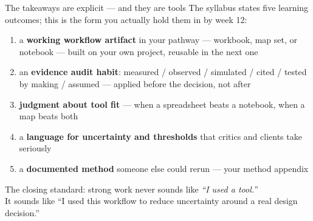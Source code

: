 \documentclass[aspectratio=169,10pt]{beamer}
\begin{document}
\begin{frame}{The takeaways are explicit --- and they are tools}
  The syllabus states five learning outcomes; this is the form you actually
  hold them in by week 12:
  \begin{enumerate}
    \item a \textbf{working workflow artifact} in your pathway --- workbook,
          map set, or notebook --- built on your own project, reusable in the
          next one
    \item an \textbf{evidence audit habit}: measured / observed / simulated /
          cited / tested by making / assumed --- applied before the decision,
          not after
    \item \textbf{judgment about tool fit} --- when a spreadsheet beats a
          notebook, when a map beats both
    \item a \textbf{language for uncertainty and thresholds} that critics and
          clients take seriously
    \item a \textbf{documented method} someone else could rerun --- your
          method appendix
  \end{enumerate}
  \vspace{3mm}
  The closing standard: strong work never sounds like \emph{``I used a tool.''}\\
  It sounds like \alert{``I used this workflow to reduce uncertainty around a
  real design decision.''}
\end{frame}
\end{document}

